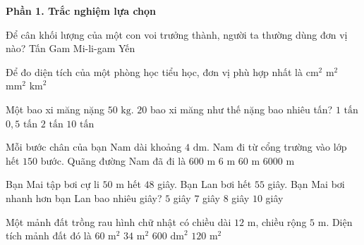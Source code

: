 \textbf{Phần 1. Trắc nghiệm lựa chọn}

\begin{ex} %
Để cân khối lượng của một con voi trưởng thành, người ta thường dùng đơn vị nào?
\choice
{\True Tấn}
{Gam}
{Mi-li-gam}
{Yến}
\end{ex}

\begin{ex} %
Để đo diện tích của một phòng học tiểu học, đơn vị phù hợp nhất là
\choice
{$\text{cm}^2$}
{\True $\text{m}^2$}
{$\text{mm}^2$}
{$\text{km}^2$}
\end{ex}

\begin{ex} %
Một bao xi măng nặng $50\text{ kg}$. $20$ bao xi măng như thế nặng bao nhiêu tấn?
\choice
{\True $1\text{ tấn}$}
{$0{,}5\text{ tấn}$}
{$2\text{ tấn}$}
{$10\text{ tấn}$}
\end{ex}

\begin{ex} %
Mỗi bước chân của bạn Nam dài khoảng $4\text{ dm}$. Nam đi từ cổng trường vào lớp hết $150$ bước. Quãng đường Nam đã đi là
\choice
{$600\text{ m}$}
{$6\text{ m}$}
{\True $60\text{ m}$}
{$6000\text{ m}$}
\end{ex}

\begin{ex} %
Bạn Mai tập bơi cự li $50\text{ m}$ hết $48$ giây. Bạn Lan bơi hết $55$ giây. Bạn Mai bơi nhanh hơn bạn Lan bao nhiêu giây?
\choice
{$5$ giây}
{\True $7$ giây}
{$8$ giây}
{$10$ giây}
\end{ex}

\begin{ex} %
Một mảnh đất trồng rau hình chữ nhật có chiều dài $12\text{ m}$, chiều rộng $5\text{ m}$. Diện tích mảnh đất đó là
\choice
{\True $60\text{ m}^2$}
{$34\text{ m}^2$}
{$600\text{ dm}^2$}
{$120\text{ m}^2$}
\end{ex}

